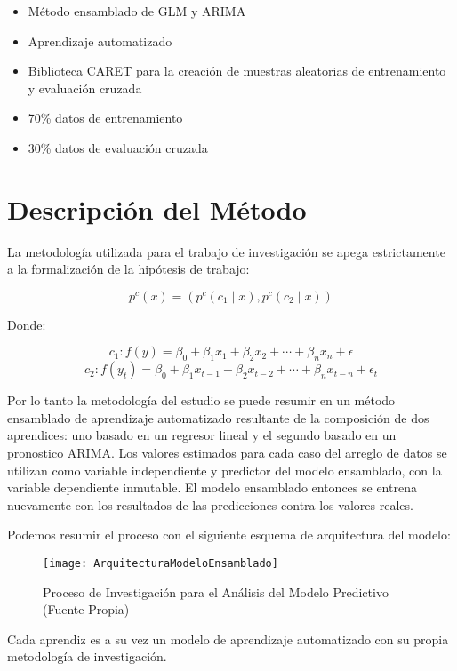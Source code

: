 \begin{spacing}{1.5}
\begin{itemize}
	\item Método ensamblado de GLM y ARIMA
	\item Aprendizaje automatizado
	\item Biblioteca CARET para la creación de muestras aleatorias de entrenamiento y evaluación cruzada
	\item 70\% datos de entrenamiento
	\item 30\% datos de evaluación cruzada
\end{itemize}
    
\section{Descripción del Método}
La metodología utilizada para el trabajo de investigación se apega estrictamente a la formalización de la hipótesis de trabajo:

\[ p^{c}(x) = (p^{c}(c_{1} \mid x),p^{c}(c_{2} \mid x)) \]

Donde:

\[ c_{1} : f(y) = \beta_{0} + \beta_{1}x_{1} + \beta_{2}x_{2} + \cdots + \beta_{n}x_{n} + \epsilon \]
\[ c_{2} : f(y_{t}) = \beta_{0} + \beta_{1}x_{t-1} + \beta_{2}x_{t-2} + \cdots + \beta_{n}x_{t-n} + \epsilon_{t}\]

Por lo tanto la metodología del estudio se puede resumir en un método ensamblado de aprendizaje automatizado resultante de la composición de dos aprendices: uno basado en un regresor lineal y el segundo basado en un pronostico ARIMA. Los valores estimados para cada caso del arreglo de datos se utilizan como variable independiente y predictor del modelo ensamblado, con la variable dependiente inmutable. El modelo ensamblado entonces se entrena nuevamente con los resultados de las predicciones contra los valores reales.   

Podemos resumir el proceso con el siguiente esquema de arquitectura del modelo:

\begin{figure}[h!]
    \centering
    \texttt{[image: ArquitecturaModeloEnsamblado]}
    \caption{Proceso de Investigación para el Análisis del Modelo Predictivo (Fuente Propia)}
\end{figure}

Cada aprendiz es a su vez un modelo de aprendizaje automatizado con su propia metodología de investigación. 


\end{spacing}
